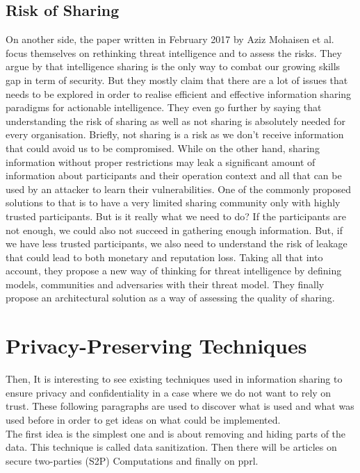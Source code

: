 \documentclass{eplmastersthesis}
\begin{document}
\subsection{Risk of Sharing}
On another side, the paper written in February 2017 by Aziz Mohaisen et al. \cite{mohaisen2017rethinking} focus themselves on rethinking threat intelligence and to assess the risks. They argue by \cite{MalikThreat} that intelligence sharing is the only way to combat our growing skills gap in term of security. But they mostly claim that there are a lot of issues that needs to be explored in order to realise efficient and effective information sharing paradigms for actionable intelligence. They even go further by saying that understanding the risk of sharing as well as not sharing is absolutely needed for every organisation.
Briefly, not sharing is a risk as we don't receive information that could avoid us to be compromised. While on the other hand, sharing information without proper restrictions may leak a significant amount of information about participants and their operation context and all that can be used by an attacker to learn their vulnerabilities.
One of the commonly proposed solutions to that is to have a very limited sharing community only with highly trusted participants. But is it really what we need to do? If the participants are not enough, we could also not succeed in gathering enough information.
But, if we have less trusted participants, we also need to understand the risk of leakage that could lead to both monetary and reputation loss. Taking all that into account, they propose a new way of thinking for threat intelligence by defining models, communities and adversaries with their threat model.
They finally propose an architectural solution as a way of assessing the quality of sharing.

\section{Privacy-Preserving Techniques}
Then, It is interesting to see existing techniques used in information sharing to ensure privacy and confidentiality in a case where we do not want to rely on trust. These following paragraphs are used to discover what is used and what was used before in order to get ideas on what could be implemented.\\

The first idea is the simplest one and is about removing and hiding parts of the data. This technique is called data sanitization. Then there will be articles on secure two-parties (S2P) Computations and finally on \gls{pprl}.\\
\end{document}
